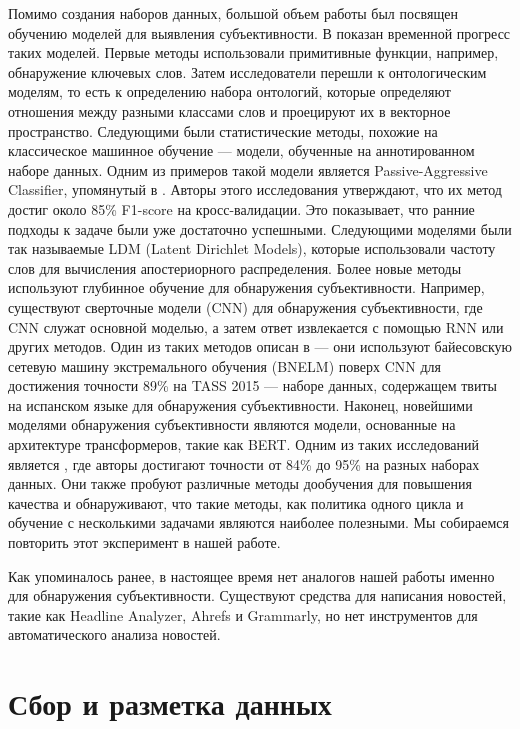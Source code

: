 \documentclass[a4paper,14pt]{extarticle}
\begin{document}
    Помимо создания наборов данных, большой объем работы был посвящен обучению моделей для выявления субъективности. В \cite{survey} показан временной прогресс таких моделей. Первые методы использовали примитивные функции, например, обнаружение ключевых слов. Затем исследователи перешли к онтологическим моделям, то есть к определению набора онтологий, которые определяют отношения между разными классами слов и проецируют их в векторное пространство. Следующими были статистические методы, похожие на классическое машинное обучение — модели, обученные на аннотированном наборе данных. Одним из примеров такой модели является Passive-Aggressive Classifier, упомянутый в \cite{fact-opinion-classifier}. Авторы этого исследования утверждают, что их метод достиг около 85\% F1-score на кросс-валидации. Это показывает, что ранние подходы к задаче были уже достаточно успешными. Следующими моделями были так называемые LDM (Latent Dirichlet Models), которые использовали частоту слов для вычисления апостериорного распределения. Более новые методы используют глубинное обучение для обнаружения субъективности. Например, существуют сверточные модели (CNN) для обнаружения субъективности, где CNN служат основной моделью, а затем ответ извлекается с помощью RNN или других методов. Один из таких методов описан в \cite{bnelm} --- они используют байесовскую сетевую машину экстремального обучения (BNELM) поверх CNN для достижения точности 89\% на TASS 2015 --- наборе данных, содержащем твиты на испанском языке для обнаружения субъективности. Наконец, новейшими моделями обнаружения субъективности являются модели, основанные на архитектуре трансформеров, такие как BERT. Одним из таких исследований является \cite{bert-finetune}, где авторы достигают точности от 84\% до 95\% на разных наборах данных. Они также пробуют различные методы дообучения для повышения качества и обнаруживают, что такие методы, как политика одного цикла и обучение с несколькими задачами являются наиболее полезными. Мы собираемся повторить этот эксперимент в нашей работе.
    
    Как упоминалось ранее, в настоящее время нет аналогов нашей работы именно для обнаружения субъективности. Существуют средства для написания новостей, такие как Headline Analyzer, Ahrefs и Grammarly, но нет инструментов для автоматического анализа новостей.
    
    \section{Сбор и разметка данных}
\end{document}
